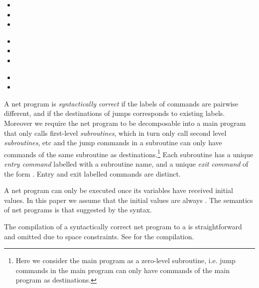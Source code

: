 \documentclass{fsttcs}
\begin{document}
\begin{minipage}[t]{.25\textwidth}
	\begin{itemize}
		\item[]  
		\item[]  
		\item[] 
	\end{itemize}
\end{minipage}\begin{minipage}[t]{.35\textwidth}
	\begin{itemize}
		\item[]  
		\item[] 
		\item[] 
	\end{itemize}
\end{minipage}\hfill \begin{minipage}[t]{.20\textwidth}
	\begin{itemize}
		\item[] 
		\item[] 
	\end{itemize}
\end{minipage}


\medskip

A net program is \emph{syntactically correct} if the labels of commands are
pairwise different, and if the destinations of jumps corresponds to existing
labels. Moreover we require the net program to be decomposable into a main
program that only calls first-level \emph{subroutines}, which in turn only call
second level \emph{subroutines}, etc and the jump commands in a subroutine can
only have commands of the same subroutine as destinations.\footnote{Here we
consider the main program as a zero-level subroutine, i.e. jump commands in the
main program can only have commands of the main program as destinations.} Each
subroutine has a unique \emph{entry command} labelled with a subroutine name,
and a unique \emph{exit command} of the form .
Entry and exit labelled commands are distinct. 


A net program can only be executed once its variables have received initial
values. In this paper we assume that the initial values are always .
The semantics of net programs is that suggested by the syntax. 

The compilation of a syntactically correct net program to a  is
straightforward and omitted due to space constraints. See \cite{esparza-course}
for the compilation.
\end{document}
